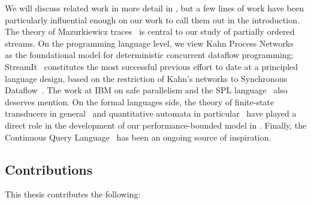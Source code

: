 We will discuss related work in more detail in , but a few lines of work have been particularly influential enough on our work to call them out in the introduction.
The theory of Mazurkiewicz traces~\cite{mazurkiewicz1986trace,DiekertR1995} is central to our study of partially ordered streams.
On the programming language level, we view Kahn Process Networks~\cite{gilles1974semantics} as the foundational model for deterministic concurrent dataflow programming; StreamIt~\cite{thies2002streamit} constitutes the most successful previous effort to date at a principled language design, based on the restriction of Kahn's networks to Synchronous Dataflow~\cite{lee1987synchronous}.
The work at IBM on safe parallelism and the SPL language~\cite{HAG2013SPL,schneider2013safe,hirzel2014catalog} also deserves mention.
On the formal languages side,
the theory of finite-state transducers in general~\cite{EH2001MDST,AC2010SST}
and quantitative automata in particular~\cite{S1961WA,DKV2009HWA,AdADRY2013CRA}
have played a direct role in the development of our performance-bounded
model in .
Finally, the Continuous Query Language~\cite{CQL,ABW2006CQL} has been an ongoing source of inspiration.

\subsection{Contributions}

This thesis contributes the following:

